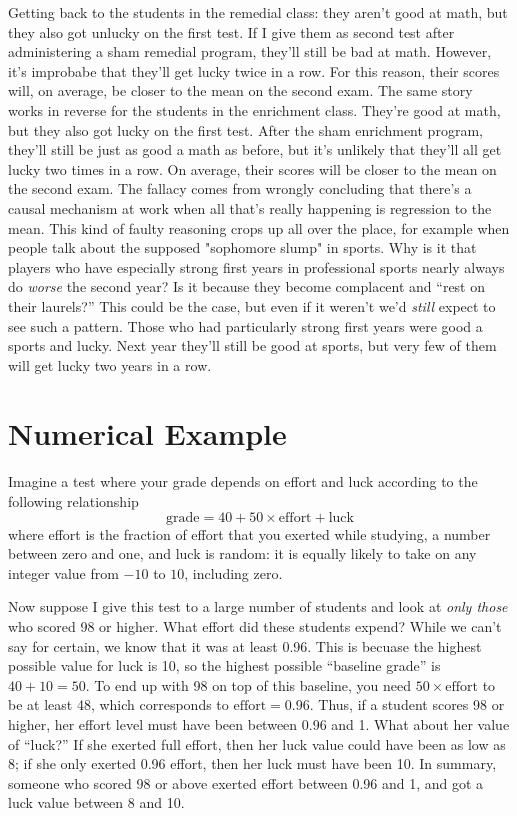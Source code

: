 \documentclass[12pt]{article}
\begin{document}
Getting back to the students in the remedial class: they aren't good at math, but they also got unlucky on the first test.
If I give them as second test after administering a sham remedial program, they'll still be bad at math.
However, it's improbabe that they'll get lucky twice in a row.
For this reason, their scores will, on average, be closer to the mean on the second exam.
The same story works in reverse for the students in the enrichment class.
They're good at math, but they also got lucky on the first test.
After the sham enrichment program, they'll still be just as good a math as before, but it's unlikely that they'll all get lucky two times in a row.
On average, their scores will be closer to the mean on the second exam.
The fallacy comes from wrongly concluding that there's a causal mechanism at work when all that's really happening is regression to the mean.
This kind of faulty reasoning crops up all over the place, for example when people talk about the supposed "sophomore slump" in sports.
Why is it that players who have especially strong first years in professional sports nearly always do \emph{worse} the second year?
Is it because they become complacent and ``rest on their laurels?''
This could be the case, but even if it weren't we'd \emph{still} expect to see such a pattern.
Those who had particularly strong first years were good a sports and lucky.
Next year they'll still be good at sports, but very few of them will get lucky two years in a row.

\section*{Numerical Example}
Imagine a test where your grade depends on effort and luck according to the following relationship
$$\mbox{grade} = 40 + 50 \times \mbox{effort} + \mbox{luck}$$
where effort is the fraction of effort that you exerted while studying, a number between zero and one, and luck is random: it is equally likely to take on any integer value from $-10$ to $10$, including zero.

Now suppose I give this test to a large number of students and look at \emph{only those} who scored 98 or higher.
What effort did these students expend?
While we can't say for certain, we know that it was at least 0.96.
This is becuase the highest possible value for luck is 10, so the highest possible ``baseline grade'' is $40 + 10 = 50$.
To end up with 98 on top of this baseline, you need $50 \times \mbox{effort}$ to be at least 48, which corresponds to $\mbox{effort} = 0.96$.
Thus, if a student scores 98 or higher, her effort level must have been between 0.96 and 1.
What about her value of ``luck?''
If she exerted full effort, then her luck value could have been as low as 8; if she only exerted 0.96 effort, then her luck must have been 10.
In summary, someone who scored 98 or above exerted effort between 0.96 and 1, and got a luck value between 8 and 10. 
\end{document}
